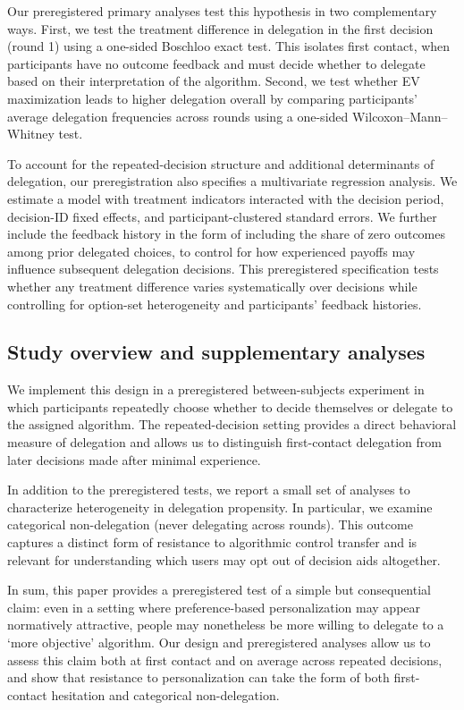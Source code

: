 \documentclass[a4paper, 12pt, fleqn]{article}
\theoremstyle{definition}
\begin{document}
Our preregistered primary analyses test this hypothesis in two complementary ways. First, we test the treatment difference in delegation in the first decision (round 1) using a one-sided Boschloo exact test. This isolates first contact, when participants have no outcome feedback and must decide whether to delegate based on their interpretation of the algorithm. Second, we test whether EV maximization leads to higher delegation overall by comparing participants' average delegation frequencies across rounds using a one-sided Wilcoxon--Mann--Whitney test.

To account for the repeated-decision structure and additional determinants of delegation, our preregistration also specifies a multivariate regression analysis. We estimate a model with treatment indicators interacted with the decision period, decision-ID fixed effects, and participant-clustered standard errors. We further include the feedback history in the form of including the share of zero outcomes among prior delegated choices, to control for how experienced payoffs may influence subsequent delegation decisions. This preregistered specification tests whether any treatment difference varies systematically over decisions while controlling for option-set heterogeneity and participants' feedback histories.

\subsection*{Study overview and supplementary analyses}
We implement this design in a preregistered between-subjects experiment in which participants repeatedly choose whether to decide themselves or delegate to the assigned algorithm. The repeated-decision setting provides a direct behavioral measure of delegation and allows us to distinguish first-contact delegation from later decisions made after minimal experience.

In addition to the preregistered tests, we report a small set of analyses to characterize heterogeneity in delegation propensity. In particular, we examine categorical non-delegation (never delegating across rounds). This outcome captures a distinct form of resistance to algorithmic control transfer and is relevant for understanding which users may opt out of decision aids altogether.

In sum, this paper provides a preregistered test of a simple but consequential claim: even in a setting where preference-based personalization may appear normatively attractive, people may nonetheless be more willing to delegate to a `more objective' algorithm. Our design and preregistered analyses allow us to assess this claim both at first contact and on average across repeated decisions, and show that resistance to personalization can take the form of both first-contact hesitation and categorical non-delegation.
\end{document}
